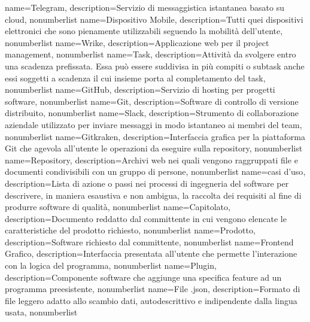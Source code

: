 {
	name={Telegram},
	description={Servizio di messaggistica istantanea basato su cloud},
	nonumberlist 
}
{
	name={Dispositivo Mobile},
	description={Tutti quei dispositivi elettronici che sono pienamente utilizzabili seguendo la mobilità dell'utente},
	nonumberlist 
}
{
	name={Wrike},
	description={Applicazione web per il project management},
	nonumberlist 
}
{
	name={Task},
	description={Attività da svolgere entro una scadenza prefissata. Essa può essere suddivisa in più compiti o subtask anche essi soggetti a scadenza il cui insieme porta al completamento del task},
	nonumberlist 
}
{
	name={GitHub},
	description={Servizio di hosting per progetti software},
	nonumberlist 
}
{
	name={Git},
	description={Software di controllo di versione distribuito},
	nonumberlist
}
{
	name={Slack},
	description={Strumento di collaborazione aziendale utilizzato per inviare messaggi in modo istantaneo ai membri del team},
	nonumberlist
}
{
	name={Gitkraken},
	description={Interfaccia grafica per la piattaforma Git che agevola all'utente le operazioni da eseguire sulla repository},
	nonumberlist
}
{
	name={Repository},
	description={Archivi web nei quali vengono raggruppati file e documenti condivisibili con un gruppo di persone},
	nonumberlist
}
{
	name={casi d'uso},
	description={Lista di azione o passi nei processi di ingegneria del software per descrivere, in maniera esaustiva e non ambigua, la raccolta dei requisiti al fine di produrre software di qualità},
	nonumberlist
}
{
	name={Capitolato},
	description={Documento reddatto dal committente in cui vengono elencate le caratteristiche del prodotto richiesto},
	nonumberlist
}
{
	name={Prodotto},
	description={Software richiesto dal committente},
	nonumberlist
}
{
	name={Frontend Grafico},
	description={Interfaccia presentata all'utente che permette l'interazione con la logica del programma},
	nonumberlist
}
{
	name={Plugin},
	description={Componente software che aggiunge una specifica feature ad un programma preesistente},
	nonumberlist
}
{
	name={File .json},
	description={Formato di file leggero adatto allo scambio dati, autodescrittivo e indipendente dalla lingua usata},
	nonumberlist
}

